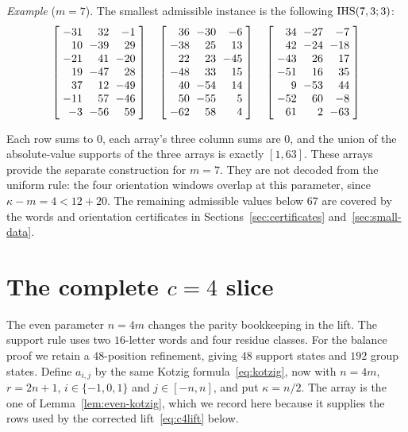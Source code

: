 \begin{center}
\emph{Example} ($m=7$). The smallest admissible instance is the following $\mathrm{IHS}(7,3;3)$:
{\footnotesize
\[
\setlength{\arraycolsep}{3pt}
\left[\begin{array}{rrr}
-31&32&-1\\10&-39&29\\-21&41&-20\\19&-47&28\\37&12&-49\\-11&57&-46\\-3&-56&59
\end{array}\right]\quad
\left[\begin{array}{rrr}
36&-30&-6\\-38&25&13\\22&23&-45\\-48&33&15\\40&-54&14\\50&-55&5\\-62&58&4
\end{array}\right]\quad
\left[\begin{array}{rrr}
34&-27&-7\\42&-24&-18\\-43&26&17\\-51&16&35\\9&-53&44\\-52&60&-8\\61&2&-63
\end{array}\right]
\]
}
\end{center}
\noindent
Each row sums to $0$, each array's three column sums are $0$, and the union of the absolute-value
supports of the three arrays is exactly $[1,63]$.
These arrays provide the separate construction for $m=7$. They are not decoded from the
uniform rule: the four orientation windows overlap at this parameter, since
$\kappa-m=4<12+20$. The remaining admissible values below $67$ are covered by the words and
orientation certificates in Sections~\ref{sec:certificates} and~\ref{sec:small-data}.




\section{The complete \texorpdfstring{$c=4$}{c=4} slice}\label{sec:c4full}

The even parameter $n=4m$ changes the parity bookkeeping in the lift. The support rule uses
two $16$-letter words and four residue classes. For the balance proof we retain a
$48$-position refinement, giving $48$ support states and $192$ group states.
Define $a_{i,j}$ by the same Kotzig formula~\eqref{eq:kotzig}, now with
$n=4m$, $r=2n+1$, $i\in\{-1,0,1\}$ and $j\in[-n,n]$, and put $\kappa=n/2$. The array is the one
of Lemma~\ref{lem:even-kotzig}, which we record here because it supplies the rows used by
the corrected lift~\eqref{eq:c4lift} below.

